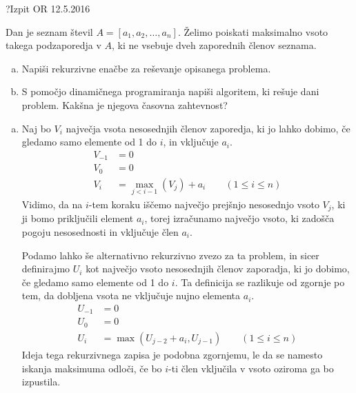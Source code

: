 \begin{naloga}{?}{Izpit OR 12.5.2016}
\begin{vprasanje}
Dan je seznam števil $A = [a_1, a_2, \dots, a_n]$.
Želimo poiskati maksimalno vsoto takega podzaporedja v $A$,
ki ne vsebuje dveh zaporednih členov seznama.

\begin{enumerate}[(a)]
\item Napiši rekurzivne enačbe za reševanje opisanega problema.

\item S pomočjo dinamičnega programiranja napiši algoritem,
ki rešuje dani problem.
Kakšna je njegova časovna zahtevnost?
\end{enumerate}
\end{vprasanje}
\begin{odgovor}

\begin{enumerate}[(a)]

\item Naj bo $V_i$ največja vsota nesosednjih členov zaporedja, ki jo lahko dobimo,
če gledamo samo elemente od 1 do $i$, in vključuje $a_i$.
\begin{align*}
V_{-1} &= 0 \\
V_0 &= 0 \\
V_i &= \max_{j < i - 1}\left(V_j\right) + a_i
\qquad (1 \le i \le n)
\end{align*}
Vidimo, da na $i$-tem koraku iščemo največjo prejšnjo nesosednjo vsoto $V_j$,
ki ji bomo priključili element $a_i$, torej izračunamo največjo vsoto, 
ki zadošča pogoju nesosednosti in vključuje člen $a_i$.

Podamo lahko še alternativno rekurzivno zvezo za ta problem, in sicer 
definirajmo $U_i$ kot največjo vsoto nesosednjih členov zaporadja, ki jo dobimo, 
če gledamo samo elemente od 1 do $i$.
Ta definicija se razlikuje od zgornje po tem,
da dobljena vsota ne vključuje nujno elementa $a_i$.
\begin{align*}
U_{-1} &= 0 \\
U_0 &= 0 \\
U_i &= \max\left(U_{j - 2} + a_i, U_{j - 1}\right)
\qquad (1 \le i \le n)
\end{align*}
Ideja tega rekurzivnega zapisa je podobna zgornjemu,
le da se namesto iska\-nja maksimuma odloči,
če bo $i$-ti člen vključila v vsoto oziroma ga bo izpustila.


\end{enumerate}
\end{odgovor}
\end{naloga}
